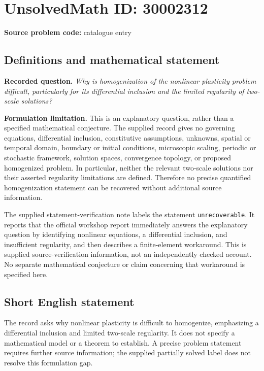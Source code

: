 \documentclass[11pt]{article}
\begin{document}
\section*{UnsolvedMath ID: 30002312}
\textbf{Source problem code:} catalogue entry
\subsection{Definitions and mathematical statement}
\textbf{Recorded question.} \emph{Why is homogenization of the nonlinear plasticity problem difficult, particularly for its differential inclusion and the limited regularity of two-scale solutions?}

\textbf{Formulation limitation.} This is an explanatory question, rather than a specified mathematical conjecture. The supplied record gives no governing equations, differential inclusion, constitutive assumptions, unknowns, spatial or temporal domain, boundary or initial conditions, microscopic scaling, periodic or stochastic framework, solution spaces, convergence topology, or proposed homogenized problem. In particular, neither the relevant two-scale solutions nor their asserted regularity limitations are defined. Therefore no precise quantified homogenization statement can be recovered without additional source information.

The supplied statement-verification note labels the statement \texttt{unrecoverable}. It reports that the official workshop report immediately answers the explanatory question by identifying nonlinear equations, a differential inclusion, and insufficient regularity, and then describes a finite-element workaround. This is supplied source-verification information, not an independently checked account. No separate mathematical conjecture or claim concerning that workaround is specified here.
\subsection{Short English statement}
The record asks why nonlinear plasticity is difficult to homogenize, emphasizing a differential inclusion and limited two-scale regularity. It does not specify a mathematical model or a theorem to establish. A precise problem statement requires further source information; the supplied partially solved label does not resolve this formulation gap.
\end{document}
